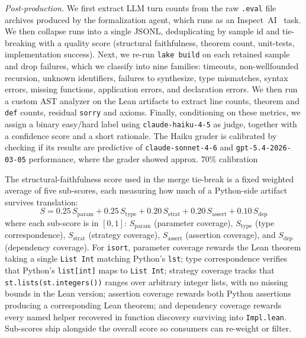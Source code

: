 \emph{Post-production.} We first extract LLM turn counts from the raw \texttt{.eval} file archives produced by the formalization agent, which runs as an  Inspect~AI~\cite{UKAISI_inspect_2024} task. We then collapse runs into a single JSONL, deduplicating by sample id and tie-breaking with a quality score (structural faithfulness, theorem count, unit-tests, implementation success). Next, we re-run
\texttt{lake build} on each retained sample and drop failures, which we classify into nine families: timeouts, non-wellfounded recursion, unknown identifiers, failures to synthesize, type mismatches, syntax errors, missing functions, application errors, and declaration errors. We then run a custom AST analyzer on the Lean artifacts to extract line counts, theorem and \texttt{def} counts, residual  \texttt{sorry} and axioms. Finally, conditioning on these metrics, we assign a binary easy/hard label using \texttt{claude-haiku-4-5} as judge, together with
a confidence score and a short rationale. The Haiku grader is calibrated by checking if its results are predictive of \texttt{claude-sonnet-4-6} and \texttt{gpt-5.4-2026-03-05} performance, where the grader showed approx. 70\% calibration

The structural-faithfulness score used in the merge tie-break is a fixed weighted average of five sub-scores, each measuring how much of a Python-side artifact survives translation:
\begin{equation}
  S = 0.25\,S_{\text{param}} + 0.25\,S_{\text{type}} + 0.20\,S_{\text{strat}} + 0.20\,S_{\text{assert}} + 0.10\,S_{\text{dep}}
  \label{eq:faithfulness}
\end{equation}
where each sub-score is in $[0,1]$: $S_{\text{param}}$ (parameter coverage), $S_{\text{type}}$ (type correspondence), $S_{\text{strat}}$ (strategy coverage), $S_{\text{assert}}$ (assertion coverage), and $S_{\text{dep}}$ (dependency coverage). For
\texttt{isort}, parameter coverage rewards the Lean theorem taking a
single \texttt{List Int} matching Python's \texttt{lst}; type
correspondence verifies that Python's  \texttt{list[int]} maps to \texttt{List Int}; strategy coverage tracks that \texttt{st.lists(st.integers())} ranges over arbitrary integer lists, with no missing bounds in the Lean version; assertion coverage rewards both Python assertions producing a corresponding Lean theorem; and dependency coverage rewards every named helper recovered in function discovery surviving into \texttt{Impl.lean}. Sub-scores ship alongside the overall score so consumers can re-weight or filter.

